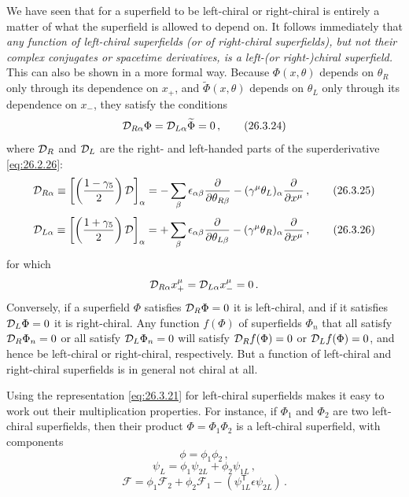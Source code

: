 We have seen that for a superfield to be left-chiral or right-chiral is
entirely a matter of what the superfield is allowed to depend on. It follows
immediately that \emph{any function of left-chiral superfields (or of
right-chiral superfields), but not their complex conjugates or spacetime
derivatives, is a left-(or right-)chiral superfield.} This can also be shown in
a more formal way. Because $\Phi(x,\theta)$ depends on $\theta_R$ only through
its dependence on $x_+$, and $\widetilde{\Phi}(x,\theta)$ depends on $\theta_L$
only through its dependence on $x_-$, they satisfy the conditions
\begin{equation}
  \mathcal{D}_{R\alpha}\Phi
  =\mathcal{D}_{L\alpha}\widetilde{\Phi}=0\,,
  \tag{26.3.24}\label{eq:26.3.24}
\end{equation}
where $\mathcal{D}_R$ and $\mathcal{D}_L$ are the right- and left-handed parts of the
superderivative \eqref{eq:26.2.26}:
\begin{equation}
  \mathcal{D}_{R\alpha}
  \equiv\left[\left(\frac{1-\gamma_5}{2}\right)\mathcal{D}\right]_\alpha
  =-\sum_\beta\epsilon_{\alpha\beta}
    \frac{\partial}{\partial\theta_{R\beta}}
  -(\gamma^\mu\theta_L)_\alpha\frac{\partial}{\partial x^\mu}\,,
  \tag{26.3.25}\label{eq:26.3.25}
\end{equation}
\begin{equation}
  \mathcal{D}_{L\alpha}
  \equiv\left[\left(\frac{1+\gamma_5}{2}\right)\mathcal{D}\right]_\alpha
  =+\sum_\beta\epsilon_{\alpha\beta}
    \frac{\partial}{\partial\theta_{L\beta}}
  -(\gamma^\mu\theta_R)_\alpha\frac{\partial}{\partial x^\mu}\,,
  \tag{26.3.26}\label{eq:26.3.26}
\end{equation}
for which
\[
  \mathcal{D}_{R\alpha}x_+^\mu
  =\mathcal{D}_{L\alpha}x_-^\mu=0\,.
\]
Conversely, if a superfield $\Phi$ satisfies $\mathcal{D}_R\Phi=0$ it is
left-chiral, and if it satisfies $\mathcal{D}_L\Phi=0$ it is right-chiral. Any
function $f(\Phi)$ of superfields $\Phi_n$ that all satisfy
$\mathcal{D}_R\Phi_n=0$ or all satisfy $\mathcal{D}_L\Phi_n=0$ will satisfy
$\mathcal{D}_Rf(\Phi)=0$ or $\mathcal{D}_Lf(\Phi)=0$, and hence be left-chiral or
right-chiral, respectively. But a function of left-chiral and right-chiral
superfields is in general not chiral at all.

Using the representation \eqref{eq:26.3.21} for left-chiral superfields makes
it easy to work out their multiplication properties. For instance, if
$\Phi_1$ and $\Phi_2$ are two left-chiral superfields, then their product
$\Phi=\Phi_1\Phi_2$ is a left-chiral superfield, with components
\begin{equation}
  \phi=\phi_1\phi_2\,,
  \tag{26.3.27}\label{eq:26.3.27}
\end{equation}
\begin{equation}
  \psi_L=\phi_1\psi_{2L}+\phi_2\psi_{1L}\,,
  \tag{26.3.28}\label{eq:26.3.28}
\end{equation}
\begin{equation}
  \mathcal{F}
  =\phi_1\mathcal{F}_2+\phi_2\mathcal{F}_1
  -(\psi_{1L}^{\mathsf T}\epsilon\psi_{2L})\,.
  \tag{26.3.29}\label{eq:26.3.29}
\end{equation}

